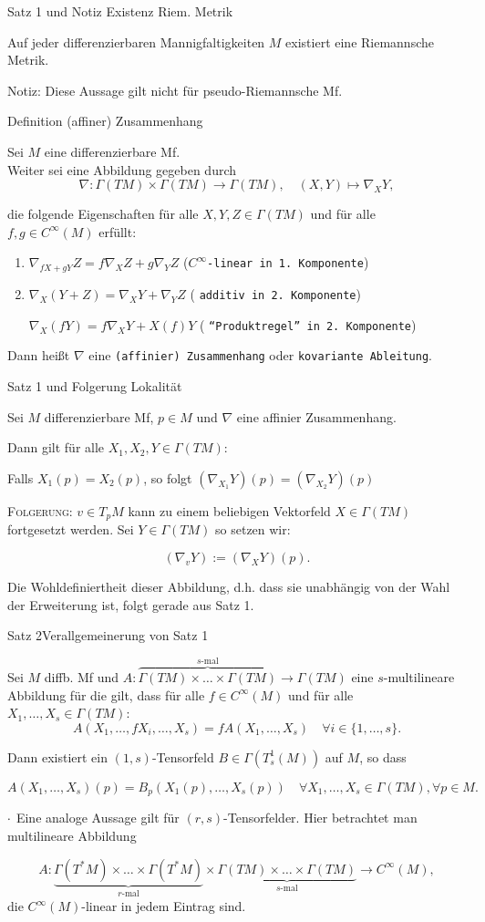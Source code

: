 \documentclass[a6paper,11pt,grid=front]{kartei}
\newcommand{\fl}[1]{\begin{flushleft}
 #1 \end{flushleft}}
\newcounter{def}
\begin{document}
\nonameyet
{Satz 1 und Notiz} {Existenz Riem. Metrik}
{
Auf jeder differenzierbaren Mannigfaltigkeiten $M$ existiert eine Riemannsche 
Metrik.
\\
\fl{Notiz: Diese Aussage gilt nicht für pseudo-Riemannsche Mf.}

}
{}


\nonameyet
{Definition \thedef} {(affiner) Zusammenhang}
{
	\small
Sei $M$ eine differenzierbare Mf.
\\
Weiter sei eine Abbildung gegeben durch
\[
\nabla: \Gamma(TM) \times \Gamma(TM) \to \Gamma(TM), 
\quad (X,Y) \mapsto \nabla_X Y,
\]
\fl{die folgende Eigenschaften für alle $X,Y,Z\in \Gamma(TM)$ und 
für alle $f,g \in C^\infty(M)$ erfüllt:}
\begin{enumerate}[1.]
\item 
$\nabla_{fX+gY}Z = f\nabla_X Z + g \nabla_Y Z$ 
\hfill (\texttt{$C^\infty$-linear in 1. Komponente})
\item $\nabla_X(Y+Z) = \nabla_X Y + \nabla_YZ$
\hfill ( \texttt{additiv in 2. Komponente})

$\nabla_X(fY) = f\nabla_X Y + X(f)Y$
\hfill ( \texttt{``Produktregel'' in 2. Komponente})
\end{enumerate}

\fl{Dann heißt $\nabla$ eine \texttt{(affinier) Zusammenhang} oder 
\texttt{kovariante Ableitung}.}
}
{}

\nonameyet
{Satz 1 und Folgerung} {Lokalität}
{
\small
Sei $M$ differenzierbare Mf, $p\in M$ und $\nabla$ eine affinier Zusammenhang.
\fl{Dann gilt für alle $X_1,X_2,Y \in \Gamma(TM)$:}
Falls $X_1(p) = X_2(p)$, so folgt
$
(\nabla_{X_1} Y)(p) = (\nabla_{X_2} Y)(p)
$

\fl{ \textsc{Folgerung:} 
$v\in T_pM$ kann zu einem beliebigen Vektorfeld $X\in\Gamma{(TM)}$
fortgesetzt werden. Sei $Y\in\Gamma(TM)$ so setzen wir:}
\[
(\nabla_v Y) := (\nabla_XY)(p).
\]
\fl{Die Wohldefiniertheit dieser Abbildung, d.h. dass sie unabhängig
von der Wahl der Erweiterung ist, folgt gerade aus Satz 1.}
}
{}

\nonameyet
{Satz 2}{Verallgemeinerung von Satz 1}
{
\small
Sei $M$ diffb. Mf und 
$A: \overbrace{\Gamma(TM)\times \dots \times \Gamma(TM)}^{s\text{-mal}} 
\to \Gamma(TM)$ eine $s$-multilineare Abbildung für die gilt,
{dass für alle $f\in C^\infty(M)$ und 
für alle $X_1,\dots,X_s \in \Gamma(TM)$:}
\[
A(X_1,\dots,fX_i,\dots,X_s) = fA(X_1,\dots,X_s)
\quad \forall i \in \{1,\dots,s\}.
\]
\fl{Dann existiert ein $(1,s)$-Tensorfeld $B \in \Gamma(T^1_s(M))$ auf $M$,
so dass }
\[
A(X_1,\dots,X_s)(p) = B_p(X_1(p),\dots,X_s(p)) 
\quad \forall X_1,\dots, X_s \in \Gamma(TM), \forall p\in M.
\]
%
\fl{$\mathbf{\cdot}$ Eine analoge Aussage gilt für $(r,s)$-Tensorfelder. 
Hier betrachtet man multilineare Abbildung}
\[
A: \underbrace{\Gamma(T^*M)\times \dots \times \Gamma(T^*M)}_{r\text{-mal}} 
\times 
\underbrace{\Gamma(TM) \times \dots \times \Gamma(TM)}_{s\text{-mal}} 
\to C^\infty(M),
\]
die $C^\infty(M)$-linear in jedem Eintrag sind.
}
{}
\end{document}
